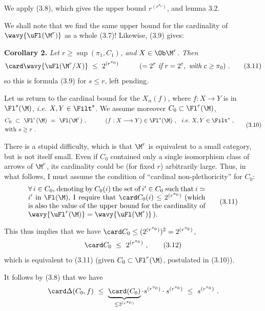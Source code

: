 We apply (3.8), which gives the upper bound $r^{(r^{\pi_0})}$, and lemma 3.2.

We shall note that we find the same upper bound for the cardinality of $\wavy{\uFl(\M^r)}$ as a whole (3.7)! Likewise, (3.9) gives:

\textbf{Corollary 2.} \textit{Let $r\geq\sup(\pi_1,C_1)$, and $X\in\Ob\M^r$. Then}
\[
\card\wavy{\uFl(\M^r/X)}\ \leq\ 2^{(r^{\pi_0})}\qquad\quad(=2^r\ \textit{if}\ r=2^c,\ \textit{with}\ c\geq\pi_0)\ . \tag*{(3.11)}
\]
so this is formula (3.9) for $s\leq r$, left pending.

Let us return to the cardinal bound for the $X_\alpha(f)$, where $f : X\longrightarrow Y$ is in $\Fl^s(\M)$, \textit{i.e.} $X,Y\in\Filt^s$. We assume moreover $C_0\subset\Fl^r(\M)$,
\[
\begin{aligned}
&C_0\ \subset\ \Fl^r(\M)\ =\ \Fl(\M^r)\ ,\qquad\quad(f:X\longrightarrow Y)\in\Fl^s(\M)\ ,\ \ \textit{i.e.}\ X,Y\in\Filt^s\ ,\\
&\text{with } s\geq r\ .
\end{aligned} \tag*{(3.10)}
\]

 There is a stupid difficulty, which is that $\M^r$ is equivalent to a small category, but is not itself small. Even if $C_0$ contained only a single isomorphism class of arrows of $\M^r$, its cardinality could be (for fixed $r$) arbitrarily large. Thus, in what follows, I must assume the condition of ``cardinal non-plethoricity'' for $C_0$:
\[
\parbox{0.72\linewidth}{$\forall\,i\in C_0$, denoting by $C_0(i)$ the set of $i'\in C_0$ such that $i\simeq i'$ in $\Fl(\M)$, I require that $\card C_0(i)\leq 2^{(r^{\pi_0})}$ (which is also the value of the upper bound for the cardinality of $\wavy{\uFl^r(\M)}=\wavy{\uFl(\M^r)}$\,).} \tag*{(3.11)}
\]

 This thus implies that we have $\card C_0\leq(2^{(r^{\pi_0})})^2=2^{(r^{\pi_0})}$,
\[
\card C_0\ \leq\ 2^{(r^{\pi_0})}\ , \tag*{(3.12)}
\]
which is equivalent to (3.11) (given $C_0\subset\Fl^r(\M)$, postulated in (3.10)).

It follows by (3.8) that we have
\[
\card\Delta(C_0,f)\ \leq\ \underbrace{\card(C_0)}_{\leq 2^{(r^{\pi_0})}}\cdot s^{(r^{\pi_0})}\cdot s^{(r^{\pi_0})}\ \leq\ s^{(r^{\pi_0})}\ .
\]

